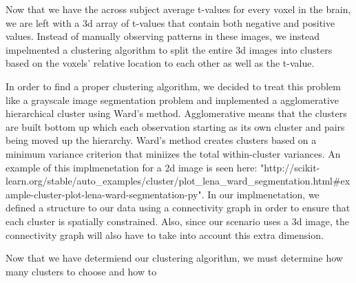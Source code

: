 \par Now that we have the across subject average t-values for every voxel in the brain, we are left with a 3d array of t-values that contain both negative and positive values. Instead of manually observing patterns in these images, we instead impelmented a clustering algorithm to split the entire 3d images into clusters based on the voxels' relative location to each other as well as the t-value. 

\par In order to find a proper clustering algorithm, we decided to treat this problem like a grayscale image segmentation problem and implemented a agglomerative hierarchical cluster using Ward's method. Agglomerative means that the clusters are built bottom up which each observation starting as its own cluster and pairs being moved up the hierarchy. Ward's method creates clusters based on a minimum variance criterion that miniizes the total within-cluster variances. An example of this implmenetation for a 2d image is seen here: "http://scikit-learn.org/stable/auto_examples/cluster/plot_lena_ward_segmentation.html#example-cluster-plot-lena-ward-segmentation-py". In our implmenetation, we defined a structure to our data using a connectivity graph in order to ensure that each cluster is spatially constrained. Also, since our scenario uses a 3d image, the connectivity graph will also have to take into account this extra dimension. 

\par Now that we have determiend our clustering algorithm, we must determine how many clusters to choose and how to 




